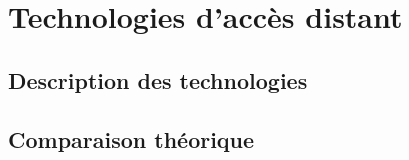 \part{Technologies d'accès distant}
\chapter{Description des technologies}
\label{ch:dscrp}

\chapter{Comparaison théorique}
%
